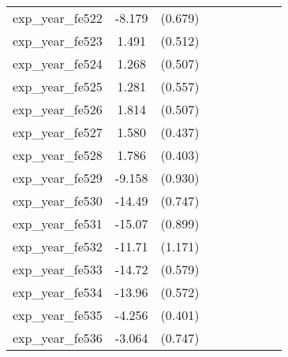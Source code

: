 {\begin{tabular}{l*{4}{cc}}
exp\_year\_fe522&   -8.179\sym{***}&  (0.679)&                  &         &                  &         &                  &         \\
exp\_year\_fe523&    1.491\sym{**} &  (0.512)&                  &         &                  &         &                  &         \\
exp\_year\_fe524&    1.268\sym{*}  &  (0.507)&                  &         &                  &         &                  &         \\
exp\_year\_fe525&    1.281\sym{*}  &  (0.557)&                  &         &                  &         &                  &         \\
exp\_year\_fe526&    1.814\sym{***}&  (0.507)&                  &         &                  &         &                  &         \\
exp\_year\_fe527&    1.580\sym{***}&  (0.437)&                  &         &                  &         &                  &         \\
exp\_year\_fe528&    1.786\sym{***}&  (0.403)&                  &         &                  &         &                  &         \\
exp\_year\_fe529&   -9.158\sym{***}&  (0.930)&                  &         &                  &         &                  &         \\
exp\_year\_fe530&   -14.49\sym{***}&  (0.747)&                  &         &                  &         &                  &         \\
exp\_year\_fe531&   -15.07\sym{***}&  (0.899)&                  &         &                  &         &                  &         \\
exp\_year\_fe532&   -11.71\sym{***}&  (1.171)&                  &         &                  &         &                  &         \\
exp\_year\_fe533&   -14.72\sym{***}&  (0.579)&                  &         &                  &         &                  &         \\
exp\_year\_fe534&   -13.96\sym{***}&  (0.572)&                  &         &                  &         &                  &         \\
exp\_year\_fe535&   -4.256\sym{***}&  (0.401)&                  &         &                  &         &                  &         \\
exp\_year\_fe536&   -3.064\sym{***}&  (0.747)&                  &         &                  &         &                  &         \\

\end{tabular}}
